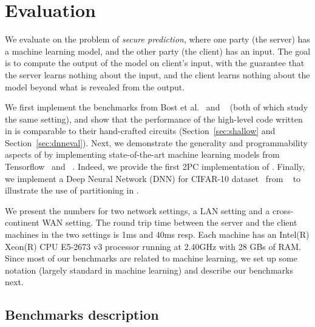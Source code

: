 \section{Evaluation}
\label{sec:eval}
We evaluate \tool on the problem of {\it secure prediction}, where one
party (the server) has a machine learning model, and the other party
(the client) has an input. The goal is to compute the output of the
model on client's input, with the guarantee that the server
learns nothing about the input, and the client learns nothing
about the model beyond what is revealed from the output.

We first implement the benchmarks from Bost et al.~\cite{shafindss}
and \minion~\cite{minionn} (both of which study the same setting),
and show that the performance of the high-level code written in \tool
is comparable to their hand-crafted circuits
(Section~\ref{sec:shallow} and Section~\ref{sec:dnneval}).
%
Next, we demonstrate the generality and programmability aspects of
\tool by implementing state-of-the-art machine learning models from
Tensorflow~\cite{tensorflow} and \bonsai~\cite{bonsai}. Indeed, we
provide the first 2PC implementation of \bonsai.
%
Finally, we
implement a Deep Neural Network (DNN) for CIFAR-10
dataset~\cite{cifar} from \minion~\cite{minionn} to illustrate the use
of partitioning in \tool.

We present the numbers for two network settings, a LAN setting and
a cross-continent WAN setting. The round trip time between the server
and the client machines in the two settings is 1ms and 40ms resp. Each
machine has an Intel(R) Xeon(R) CPU E5-2673 v3 processor running at
2.40GHz with 28 GBs of RAM.
%
Since most of our benchmarks
are related to machine learning, we set up some notation (largely
standard in machine learning) and describe our benchmarks next.

\subsection{Benchmarks description}

